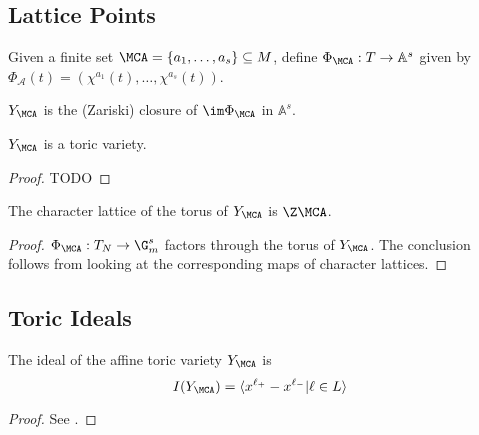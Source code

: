 \subsection{Lattice Points}


\begin{definition}
  \label{1-1-phiA}

  Given a finite set $\MCA = \{a_1, \dotsc, a_s\} \subseteq M$, define $\Phi_\MCA : T \to \mathbb{A}^s$ given by $\Phi_{\mathcal A} (t) = (\chi^{a_1} (t), \dotsc, \chi^{a_s} (t))$.
\end{definition}


\begin{definition}
  \label{1-1-7-ya}

  $Y_\MCA$ is the (Zariski) closure of $\im \Phi_\MCA$ in $\mathbb A^s$.
\end{definition}


\begin{proposition}
  \label{1-1-8-aff-tor-var-ya}

  $Y_\MCA$ is a toric variety.
\end{proposition}
\begin{proof}

  TODO
\end{proof}

\begin{proposition}
  \label{1-1-8-char-ya}

  The character lattice of the torus of $Y_\MCA$ is $\Z \MCA$.
\end{proposition}
\begin{proof}

  $\Phi_\MCA: T_N \to \G_m^s$ factors through the torus of $Y_\MCA$.
  The conclusion follows from looking at the corresponding maps of character lattices.
\end{proof}

\subsection{Toric Ideals}


\begin{proposition}
  \label{1-1-9-ideal-ya}

  The ideal of the affine toric variety $Y_\MCA$ is
  \[
    I(Y_\MCA) = \langle x^{\ell_+} - x^{\ell_-} | \ell \in L\rangle
  \]
\end{proposition}
\begin{proof}
  \uses{}

  See \cite{Cox_2011}.
\end{proof}


